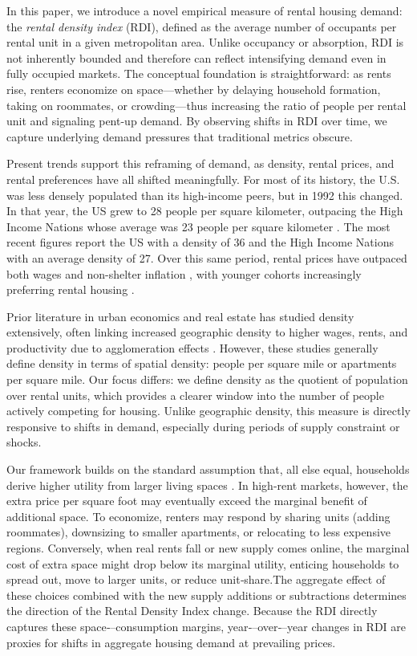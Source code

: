 \documentclass[APA,Times1COL]{WileyNJDv5} %
\begin{document}
In this paper, we introduce a novel empirical measure of rental housing demand: the \textit{rental density index} (RDI), defined as the average number of occupants per rental unit in a given metropolitan area. Unlike occupancy or absorption, RDI is not inherently bounded and therefore can reflect intensifying demand even in fully occupied markets. The conceptual foundation is straightforward: as rents rise, renters economize on space---whether by delaying household formation, taking on roommates, or crowding---thus increasing the ratio of people per rental unit and signaling pent-up demand. By observing shifts in RDI over time, we capture underlying demand pressures that traditional metrics obscure.

Present trends support this reframing of demand, as density, rental prices, and rental preferences have all shifted meaningfully. For most of its history, the U.S. was less densely populated than its high-income peers, but in 1992 this changed. In that year, the US grew to 28 people per square kilometer, outpacing the High Income Nations whose average was 23 people per square kilometer \cite{worldbankPopDensity}. The most recent figures report the US with a density of 36 and the High Income Nations with an average density of 27.  Over this same period, rental prices have outpaced both wages and non-shelter inflation \cite{feiveson2024rent, stlouisfedConsumerPrice}, with younger cohorts increasingly preferring rental housing \cite{fanniemaeConsumersFeeling}.

Prior literature in urban economics and real estate has studied density extensively, often linking increased geographic density to higher wages, rents, and productivity due to agglomeration effects \cite{titman2024city, liu2018vertical}. However, these studies generally define density in terms of spatial density: people per square mile or  apartments per square mile. Our focus differs: we define density as the quotient of population over rental units, which provides a clearer window into the number of people actively competing for housing. Unlike geographic density, this measure is directly responsive to shifts in demand, especially during periods of supply constraint or shocks. 

Our framework builds on the standard assumption that, all else equal, households derive higher utility from larger living spaces \cite{muth1969cities,molloy2022housing}. In high-rent markets, however, the extra price per square foot may eventually exceed the marginal benefit of additional space. To economize, renters may respond by sharing units (adding roommates), downsizing to smaller apartments, or relocating to less expensive regions. Conversely, when real rents fall or new supply comes online, the marginal cost of extra space might drop below its marginal utility, enticing households to spread out, move to larger units, or reduce unit‐share.The aggregate effect of these choices combined with the new supply additions or subtractions determines the direction of the Rental Density Index change. Because the RDI directly captures these space‐--consumption margins, year‐--over‐--year changes in RDI are proxies for shifts in aggregate housing demand at prevailing prices.
\end{document}
